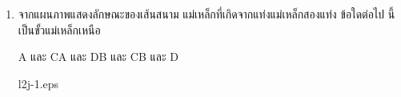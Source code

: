 \begin{enumerate}
\item   \begin{ljrp2}\runningj \nonet 
            จากแผนภาพแสดงลักษณะของเส้นสนาม
แม่เหล็กที่เกิดจากแท่งแม่เหล็กสองแท่ง   ข้อใดต่อไป
นี้เป็นขั้วแม่เหล็กเหนือ
            \begin{1c}
                {A และ C}{A และ D}{B และ C}{B และ D}
            \end{1c}
        \end{ljrp2}
        \begin{rp2}{l2j-1.eps}\end{rp2}
\end{enumerate}
